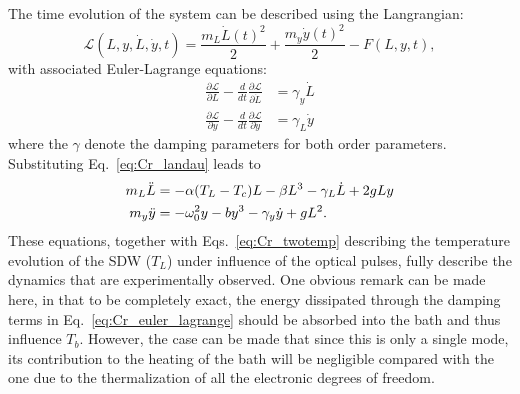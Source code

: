 The time evolution of the system can be described using the Langrangian:
\begin{equation}
    \mathcal{L}(L, y, \dot{L}, \dot{y}, t) = \frac{m_L \dot{L}(t)^2}{2} + \frac{m_y \dot{y}(t)^2}{2} - F(L, y, t),
\end{equation}
with associated Euler-Lagrange equations:
\begin{align}
    \frac{\partial \mathcal{L}}{\partial L} - \frac{d}{dt}\frac{\partial \mathcal{L}}{\partial \dot{L}} &= \gamma_y \dot{L}\\
    \frac{\partial \mathcal{L}}{\partial y} - \frac{d}{dt}\frac{\partial \mathcal{L}}{\partial \dot{y}} &= \gamma_L \dot{y}\nonumber
\end{align}
where the $\gamma$ denote the damping parameters for both order parameters.
Substituting Eq.~\ref{eq:Cr_landau} leads to 
\begin{align}
	\label{eq:Cr_euler_lagrange}
	    m_L \Ddot{L} &= -\alpha(T_L-T_c)L - \beta L^3 - \gamma_L \dot{L} + 2g L y \\
	    m_y \Ddot{y} &= -\omega_0^2 y  - b y^3 - \gamma_y \dot{y} + gL^2.\nonumber
\end{align}
These equations, together with Eqs.~\ref{eq:Cr_twotemp} describing the temperature evolution of the SDW ($T_L$) under influence of the optical pulses, fully describe the dynamics that are experimentally observed.
One obvious remark can be made here, in that to be completely exact, the energy dissipated through the damping terms in Eq.~\ref{eq:Cr_euler_lagrange} should be absorbed into the bath and thus influence $T_b$. However, the case can be made that since this is only a single mode, its contribution to the heating of the bath will be negligible compared with the one due to the thermalization of all the electronic degrees of freedom.

